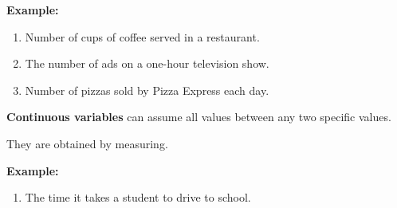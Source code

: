 \documentclass[12pt,a4paper,openany]{book}
\begin{document}
\textbf{Example:}
\begin{enumerate}
\item Number of cups of coffee served in a restaurant.
\item The number of ads on a one-hour television show.
\item Number of pizzas sold by Pizza Express each day.
\end{enumerate}

\begin{mdframed}
\textbf{Continuous variables }can assume all values 
between any two specific values.

They are obtained by measuring.
\end{mdframed}

\textbf{Example:}
\begin{enumerate}
\item The time it takes a student to drive to school.
\end{enumerate}
\end{document}

